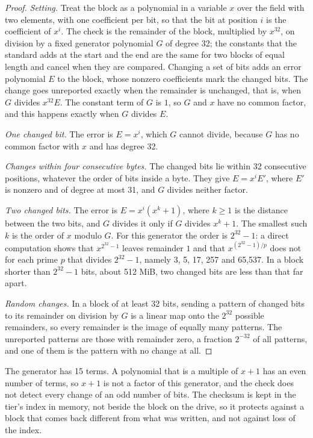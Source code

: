 \begin{proof}
\emph{Setting.} Treat the block as a polynomial in a variable $x$ over the
field with two elements, with one coefficient per bit, so that the bit at
position $i$ is the coefficient of $x^i$. The check is the remainder of the
block, multiplied by $x^{32}$, on division by a fixed generator polynomial
$G$ of degree 32; the constants that the standard adds at the start and the
end are the same for two blocks of equal length and cancel when they are
compared. Changing a set of bits adds an error polynomial $E$ to the block,
whose nonzero coefficients mark the changed bits. The change goes unreported
exactly when the remainder is unchanged, that is, when $G$ divides
$x^{32} E$. The constant term of $G$ is $1$, so $G$ and $x$ have no common
factor, and this happens exactly when $G$ divides $E$.

\emph{One changed bit.} The error is $E = x^i$, which $G$ cannot divide,
because $G$ has no common factor with $x$ and has degree 32.

\emph{Changes within four consecutive bytes.} The changed bits lie within 32
consecutive positions, whatever the order of bits inside a byte. They give
$E = x^i E'$, where $E'$ is nonzero and of degree at most 31, and $G$ divides
neither factor.

\emph{Two changed bits.} The error is $E = x^i (x^k + 1)$, where $k \ge 1$
is the distance between the two bits, and $G$ divides it only if $G$ divides
$x^k + 1$. The smallest such $k$ is the order of $x$ modulo $G$. For this
generator the order is $2^{32} - 1$: a direct computation shows that
$x^{2^{32}-1}$ leaves remainder $1$ and that $x^{(2^{32}-1)/p}$ does not for
each prime $p$ that divides $2^{32} - 1$, namely 3, 5, 17, 257 and 65,537. In
a block shorter than $2^{32} - 1$ bits, about 512 MiB, two changed bits are
less than that far apart.

\emph{Random changes.} In a block of at least 32 bits, sending a pattern of
changed bits to its remainder on division by $G$ is a linear map onto the
$2^{32}$ possible remainders, so every remainder is the image of equally many
patterns. The unreported patterns are those with remainder zero, a fraction
$2^{-32}$ of all patterns, and one of them is the pattern with no change at
all.
\end{proof}

The generator has 15 terms. A polynomial that is a multiple of $x + 1$ has an
even number of terms, so $x + 1$ is not a factor of this generator, and the
check does not detect every change of an odd number of bits. The checksum is kept in the tier's index in memory,
not beside the block on the drive, so it protects against a block that comes
back different from what was written, and not against loss of the index.

